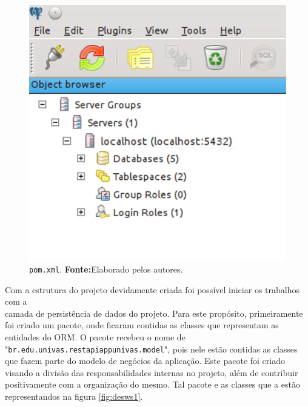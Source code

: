 \begin{figure}[h!]
	\centerline{\includegraphics[scale=0.8]{./imagens/2_q_metodologico/4_procedimentos_resultados/43_webservice/432_desenvolvimento/desws.png}}
	\caption[\texttt{pom.xml}]{\texttt{pom.xml}.
		\textbf{Fonte:}Elaborado pelos autores.}
	\label{fig:desws}
\end{figure}


	\par Com a estrutura do projeto devidamente criada foi possível iniciar os
trabalhos com a \\ camada de persistência de dados do projeto. Para este
propósito, primeiramente foi criado um pacote, onde ficaram contidas as classes
que representam as entidades do ORM. O pacote recebeu o nome de
"\texttt{br.edu.univas.restapiappunivas.model}", pois nele estão contidas as
classes que fazem parte do modelo de negócios da aplicação. Este pacote foi
criado visando a divisão das responsabilidades internas no projeto, além de
contribuir positivamente com a organização do mesmo. Tal pacote e as classes
que a estão representandos na figura \ref{fig:desws1}.

